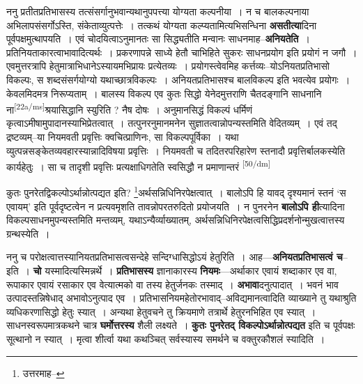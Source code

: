 \documentclass[article,12pt,a4paper]{memoir}
\begin{document}
	  \pstart ननु प्रतीतप्रतिभासस्य तत्संसर्गानुभवान्यथानुपपत्त्या योग्यता कल्पनीया । न च बालकल्पनाया अभिलापसंसर्गोऽस्ति, संकेताव्युत्पत्तेः । तत्कथं योग्यता कल्प्यतामित्यभिसन्धिना \textbf{असतीत्या}दिना पूर्वपक्षमुत्थापयति । एवं चोदयित्वाऽनुमानतः सा सिद्ध्यतीति मन्वानः साधनमाह--\textbf{अनियतेति} । प्रतिनियताकारत्वाभावादित्यर्थः । प्रकरणापन्ने साध्ये हेतौ चाभिहिते सुकरः साधनप्रयोग इति प्रयोगं न जगौ । एवमुत्तरत्रापि हेतुमात्राभिधानेऽस्यायमभिप्रायः प्रत्येतव्यः । प्रयोगस्त्वेवमिह कर्त्तव्यः--योऽनियतप्रतिभासो विकल्पः, स शब्दसंसर्गयोग्यो यथाच्छात्रविकल्पः । अनियतप्रतिभासश्च बालविकल्प इति भवत्येव प्रयोगः । केवलमिदमत्र निरूप्यताम् । बालस्य विकल्प एव कुतः सिद्धो येनेदमुत्तराणि चैतदङ्गानि साधनानि ना\leavevmode\textsuperscript{\rmlatinfont\tiny [22a/ms]}श्रयासिद्धानि स्युरिति ? नैष दोषः । अनुमानसिद्धं विकल्पं धर्मिणं कृत्वाऽमीषामुपादानस्याभिप्रेतत्वात् । तत्पुनरनुमानमनेन सुज्ञातत्वान्नोपन्यस्तमिति वेदितव्यम् । एवं तद् द्रष्टव्यम्--या नियमवती प्रवृत्तिः क्वचित्प्राणिनः, सा विकल्पपूर्विका । यथा व्युत्पन्नसङ्केतव्यवहारस्यान्नादिविषया प्रवृत्तिः । नियमवती च तदितरपरिहारेण स्तनादौ प्रवृत्तिर्बालकस्येति कार्यहेतुः । सा च तादृशी प्रवृत्तिः प्रत्यक्षाधिगतेति स्वसिद्धौ न प्रमाणान्तरं  \leavevmode\textsuperscript{\rmlatinfont\tiny [50/dm]} 
	  
	कुतः पुनरेतद्विकल्पोऽर्थान्नोत्पद्यत इति? \footnote{उत्तरमाह--\cite{dp-msD-n}}अर्थसन्निधिनिरपेक्षत्वात् । बालोऽपि हि यावद् दृश्यमानं स्तनं ‘स एवायम्’ इति पूर्वदृष्टत्वेन न प्रत्यवमृशति तावन्नोपरतरुदितो प्रयोजयति । न पुनरनेन \textbf{बालोऽपि ही}त्यादिना विकल्पसाधनमुपन्यस्तमिति मन्तव्यम्, यथाऽन्यैर्व्याख्यातम्, अर्थसन्निधिनिरपेक्षत्वसिद्धिप्रदर्शनोन्मुखत्वात्तस्य ग्रन्थस्येति ।
	\pend
      

	  \pstart ननु च परोक्षत्वात्तस्यानियतप्रतिभासत्वसन्देहे सन्दिग्धासिद्धोऽयं हेतुरिति । आह—\textbf{अनियतप्रतिभासत्वं च}--इति । \textbf{चो} यस्मादित्यस्मिन्नर्थे । \textbf{प्रतिभासस्य} ज्ञानाकारस्य \textbf{नियमः}—अर्थाकार एवायं शब्दाकार एव वा, रूपाकार एवायं रसाकार एव वेत्यात्मको वा तस्य हेतुर्जनकः तस्माद् । \textbf{अभावा}दनुत्पादात् । भवनं भाव उत्पादस्तन्निषेधाद् अभावोऽनुत्पाद एव । प्रतिभासनियमहेतोरभावाद्--अविद्यमानत्वादिति व्याख्याने तु यथाश्रुति व्यधिकरणासिद्धो हेतुः स्यात् । अन्यथा हेतुवचने तु क्रियमाणे तत्रार्थे हेतुरनभिहित एव स्यात् । साधनस्वरूपमात्रकथने चात्र \textbf{घर्मोत्तरस्य} शैली लक्ष्यते । \textbf{कुतः पुनरेतद् विकल्पोऽर्थान्नोत्पद्यत} इति च पूर्वपक्षः सूत्थानो न स्यात् । मृत्वा शीर्त्वा यथा कथञ्चित् सर्वस्यास्य समर्थने च वक्तुरकौशलं स्यादिति ।
	\pend
      
\end{document}
